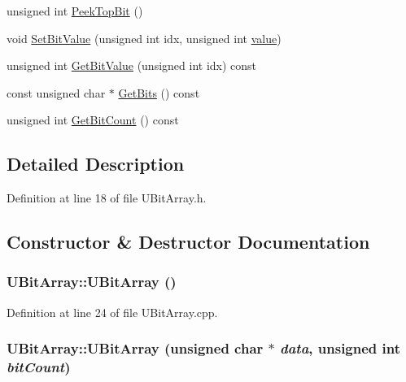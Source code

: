 \begin{CompactItemize}
unsigned int \hyperlink{class_u_bit_array_e560511d0cc3b130dd181f9e6ce576f1}{PeekTopBit} ()
\item 
void \hyperlink{class_u_bit_array_a265435baf940dc2f48ba9b38b51229f}{SetBitValue} (unsigned int idx, unsigned int \hyperlink{glext__bak_8h_6a4f8a1a444e9080b297963b3db29fe0}{value})
\item 
unsigned int \hyperlink{class_u_bit_array_6654e49916d787d8a50242bde1c581c7}{GetBitValue} (unsigned int idx) const 
\item 
const unsigned char $\ast$ \hyperlink{class_u_bit_array_6452f2d20fe94f2de39da8b927c8bbc7}{GetBits} () const 
\item 
unsigned int \hyperlink{class_u_bit_array_c6cf3c780c9bb99533551ce7b766b740}{GetBitCount} () const 
\end{CompactItemize}


\subsection{Detailed Description}


Definition at line 18 of file UBitArray.h.

\subsection{Constructor \& Destructor Documentation}
\hypertarget{class_u_bit_array_f83313fac0dd451a572604c516e241e0}{
\subsubsection[{UBitArray}]{\setlength{\rightskip}{0pt plus 5cm}UBitArray::UBitArray ()}}
\label{class_u_bit_array_f83313fac0dd451a572604c516e241e0}




Definition at line 24 of file UBitArray.cpp.\hypertarget{class_u_bit_array_02dc5ddf7cbc7d723dc93ea490de48bb}{
\subsubsection[{UBitArray}]{\setlength{\rightskip}{0pt plus 5cm}UBitArray::UBitArray (unsigned char $\ast$ {\em data}, \/  unsigned int {\em bitCount})}}
\label{class_u_bit_array_02dc5ddf7cbc7d723dc93ea490de48bb}




